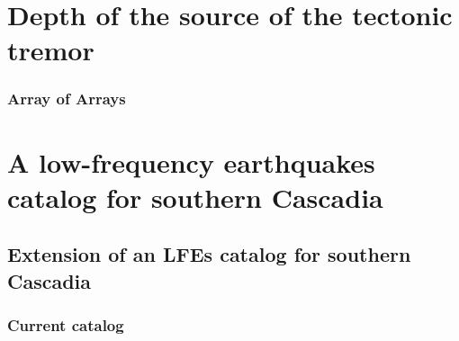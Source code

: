 \documentclass{beamer}
\begin{document}
				
	\section{Depth of the source of the tectonic tremor}

	\begin{frame}
		\frametitle{Array of Arrays}
	\end{frame}


	\section{A low-frequency earthquakes catalog for southern Cascadia}


	\subsection{Extension of an LFEs catalog for southern Cascadia}
	
	\begin{frame}
		\frametitle{Current catalog}
	\end{frame}
\end{document}
